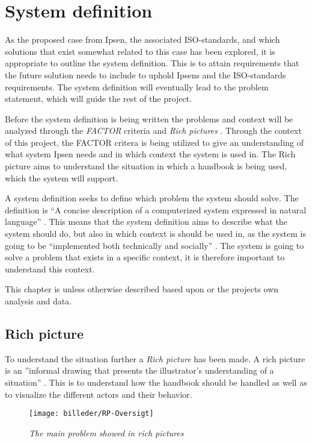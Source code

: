 \section{System definition}\label{sec:SystemDefinition}
As the proposed case from Ipsen, the associated ISO-standards, and which solutions that exist somewhat related to this case has been explored, it is appropriate to outline the system definition.
This is to attain requirements that the future solution needs to include to uphold Ipsens and the ISO-standards requirements.
The system definition will eventually lead to the problem statement, which will guide the rest of the project.

Before the system definition is being written the problems and context will be analyzed through the \textit{FACTOR} criteria and \textit{Rich pictures} \citep{Rod-Aalborg}.
Through the context of this project, the FACTOR critera is being utilized to give an understanding of what system Ipsen needs and in which context the system is used in.
The Rich picture aims to understand the situation in which a handbook is being used, which the system will support.


A system definition seeks to define which problem the system should solve.
The definition is “A concise description of a computerized system expressed in natural language” \citep[p.~24]{Rod-Aalborg}.
This means that the system definition aims to describe what the system should do, but also in which context is should be used in, as the system is going to be “implemented both technically and socially” \citep[p.~23]{Rod-Aalborg}.
The system is going to solve a problem that exists in a specific context, it is therefore important to understand this context.

This chapter is unless otherwise described based upon \cite{Rod-Aalborg} or the projects own analysis and data.

\subsection{Rich picture} \label{sec:richpictures}

To understand the situation further a \textit{Rich picture} has been made. A rich picture is an ''informal drawing that presents the illustrator's understanding of a situation'' \citep[~p. 26]{Rod-Aalborg}.
This is to understand how the handbook should be handled as well as to visualize the different actors and their behavior.

\begin{figure}[H]
	\centering
	\texttt{[image: billeder/RP-Oversigt]}
	\caption{\textit{The main problem showed in rich pictures
	}}
	\label{fig:RP-Oversigt}
\end{figure}

